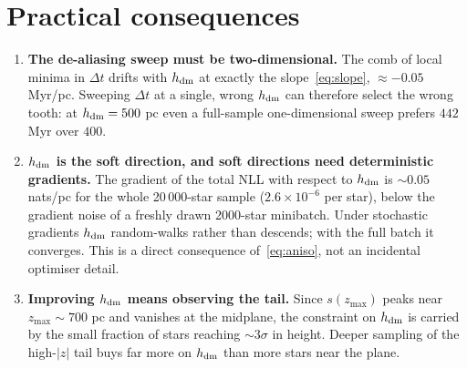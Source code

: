 \documentclass[11pt,a4paper]{article}
\newcommand{\hdm}{h_{\rm dm}}
\newcommand{\dt}{\Delta t}
\newcommand{\zmax}{z_{\max}}
\begin{document}
\section{Practical consequences}

\begin{enumerate}
\item \textbf{The de-aliasing sweep must be two-dimensional.}  The comb of local
      minima in $\dt$ drifts with $\hdm$ at exactly the slope~\eqref{eq:slope},
      $\approx-0.05$ Myr/pc.  Sweeping $\dt$ at a single, wrong $\hdm$ can
      therefore select the wrong tooth: at $\hdm=500$ pc even a full-sample
      one-dimensional sweep prefers $442$ Myr over $400$.

\item \textbf{$\hdm$ is the soft direction, and soft directions need
      deterministic gradients.}  The gradient of the total NLL with respect to
      $\hdm$ is $\sim\!0.05$ nats/pc for the whole 20\,000-star sample
      ($2.6\times10^{-6}$ per star), below the gradient noise of a freshly drawn
      2000-star minibatch.  Under stochastic gradients $\hdm$ random-walks rather
      than descends; with the full batch it converges.  This is a direct
      consequence of~\eqref{eq:aniso}, not an incidental optimiser detail.

\item \textbf{Improving $\hdm$ means observing the tail.}  Since $s(\zmax)$ peaks
      near $\zmax\sim700$ pc and vanishes at the midplane, the constraint on
      $\hdm$ is carried by the small fraction of stars reaching $\sim\!3\sigma$
      in height.  Deeper sampling of the high-$|z|$ tail buys far more on $\hdm$
      than more stars near the plane.
\end{enumerate}
\end{document}
